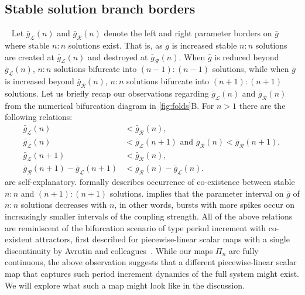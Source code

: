 \subsection{Stable solution branch borders}
~\label{sec:borders}
Let $\bar g_{\mathcal{L}}(n)$ and $\bar g_{\mathcal{R}}(n)$ denote the left and right parameter borders on $\bar g$ where stable $n:n$ solutions exist.
That is, as $\bar g$ is increased stable $n:n$ solutions are created at $\bar g_{\mathcal{L}}(n)$ and destroyed at $\bar g_{\mathcal{R}}(n)$.
When $\bar g$ is reduced beyond $\bar g_{\mathcal{L}}(n)$, $n:n$ solutions bifurcate into $(n-1):(n-1)$ solutions, while when $\bar g$ is increased beyond $\bar g_{\mathcal{R}}(n)$, $n:n$ solutions bifurcate into $(n+1):(n+1)$ solutions.
Let us briefly recap our observations regarding $\bar g_{\mathcal{L}}(n)$ and $\bar g_{\mathcal{R}}(n)$ from the numerical bifurcation diagram in \cref{fig:folds}B.
For $n>1$ there are the following relations:
\begin{align}
	\bar g_{\mathcal{L}}(n)                               & < \bar g_{\mathcal{R}}(n)\label{eq:easy1},                                                                 \\
	\bar g_{\mathcal{L}}(n)                               & < \bar g_{\mathcal{L}}(n+1)\text{ and } \bar g_{\mathcal{R}}(n)<\bar g_{\mathcal{R}}(n+1)\label{eq:easy2}, \\
	\bar g_{\mathcal{L}}(n+1)                             & < \bar g_{\mathcal{R}}(n)\label{eq:coexistence},                                                           \\
	\bar g_{\mathcal{R}}(n+1) - \bar g_{\mathcal{L}}(n+1) & < \bar g_{\mathcal{R}}(n) - \bar g_{\mathcal{L}}(n)\label{eq:robustness}.
\end{align}
 are self-explanatory.
 formally describes occurrence of co-existence between stable $n:n$ and $(n+1):(n+1)$ solutions.
 implies that the parameter interval on $\bar g$ of $n:n$ solutions decreases with $n$, in other words, bursts with more spikes occur on increasingly smaller intervals of the coupling strength.
All of the above relations are reminiscent of the bifurcation scenario of type period increment with co-existent attractors, first described for piecewise-linear scalar maps with a single discontinuity by Avrutin and colleagues~\cite[e.g.
	see][]{gardini2012,tramontana2012,avrutin2011}.
While our maps $\Pi_n$ are fully continuous, the above observation suggests that a different piecewise-linear scalar map that captures such period increment dynamics of the full system might exist.
We will explore what such a map might look like in the discussion.

